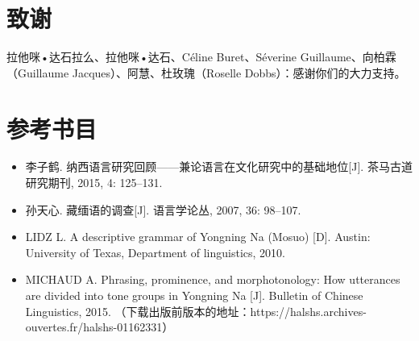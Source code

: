\documentclass[oldfontcommands,oneside,a4paper,11pt]{article}
\newcommand{\zh}[1]{{\cn #1}}
\begin{document}
	\section{ \zh{致谢}} \label{sec:thks}
	
	\zh{拉他咪•达石拉么、拉他咪•达石、}Céline Buret\zh{、}Séverine Guillaume\zh{、向柏霖}（Guillaume Jacques）\zh{、阿慧、杜玫瑰}（Roselle Dobbs）\zh{：感谢你们的大力支持。}
	
	
	\section{\zh{参考书目}} \label{sec:refs}
	\begin{itemize}
		\item \zh{李子鹤. 纳西语言研究回顾——兼论语言在文化研究中的基础地位[J]. 茶马古道研究期刊, 2015, 4: 125–131.}
		\item \zh{孙天心. 藏缅语的调查[J]. 语言学论丛, 2007, 36: 98–107.}
		\item LIDZ L. A descriptive grammar of Yongning Na (Mosuo) [D]. Austin: University of Texas, Department of linguistics, 2010.
		\item MICHAUD A. Phrasing, prominence, and morphotonology: How utterances are divided into tone groups in Yongning Na [J]. Bulletin of Chinese Linguistics, 2015. \zh{（下载出版前版本的地址：}https://halshs.archives-ouvertes.fr/halshs-01162331\zh{）}
	\end{itemize}
	
	
	
\end{document}
